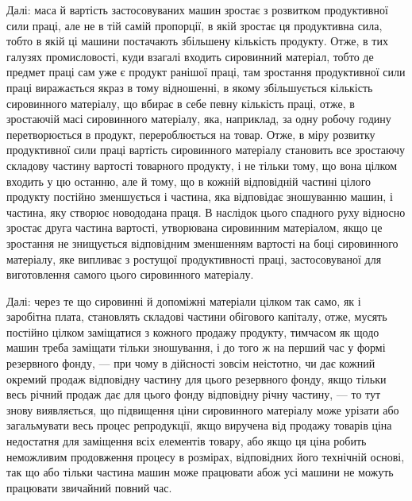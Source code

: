 Далі: маса й вартість застосовуваних машин зростає з розвитком
продуктивної сили праці, але не в тій самій пропорції,
в якій зростає ця продуктивна сила, тобто в якій ці машини
постачають збільшену кількість продукту. Отже, в тих галузях
промисловості, куди взагалі входить сировинний матеріал, тобто
де предмет праці сам уже є продукт ранішої праці, там зростання
продуктивної сили праці виражається якраз в тому відношенні,
в якому збільшується кількість сировинного матеріалу,
що вбирає в себе певну кількість праці, отже, в зростаючій масі
сировинного матеріалу, яка, наприклад, за одну робочу годину перетворюється
в продукт, перероблюється на товар. Отже, в
міру розвитку продуктивної сили праці вартість сировинного
матеріалу становить все зростаючу складову частину вартості
товарного продукту, і не тільки тому, що вона цілком входить
у цю останню, але й тому, що в кожній відповідній частині
цілого продукту постійно зменшується і частина, яка відповідає
зношуванню машин, і частина, яку створює новододана праця.
В наслідок цього спадного руху відносно зростає друга частина
вартості, утворювана сировинним матеріалом, якщо це зростання
не знищується відповідним зменшенням вартості на боці сировинного
матеріалу, яке випливає з ростущої продуктивності
праці, застосовуваної для виготовлення самого цього сировинного
матеріалу.

Далі: через те що сировинні й допоміжні матеріали цілком
так само, як і заробітна плата, становлять складові частини
обігового капіталу, отже, мусять постійно цілком заміщатися
з кожного продажу продукту, тимчасом як щодо машин треба
заміщати тільки зношування, і до того ж на перший час у формі
резервного фонду, — при чому в дійсності зовсім неістотно, чи
дає кожний окремий продаж відповідну частину для цього
резервного фонду, якщо тільки весь річний продаж дає для
цього фонду відповідну річну частину, — то тут знову виявляється,
що підвищення ціни сировинного матеріалу може урізати
або загальмувати весь процес репродукції, якщо виручена
від продажу товарів ціна недостатня для заміщення всіх елементів
товару, або якщо ця ціна робить неможливим продовження
процесу в розмірах, відповідних його технічній основі,
так що або тільки частина машин може працювати абож усі
машини не можуть працювати звичайний повний час.

